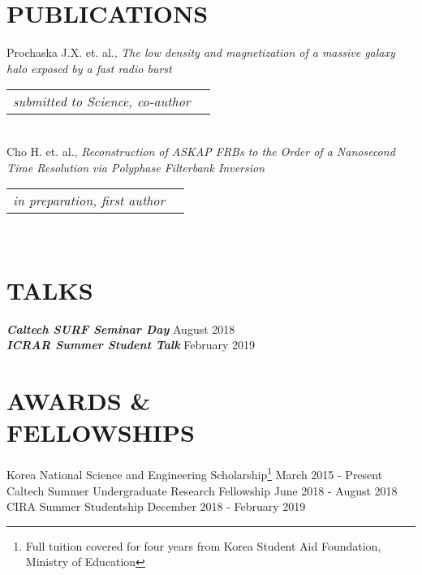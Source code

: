\documentclass[margin, 10pt]{res} %
\begin{document}
\begin{resume}

\section{PUBLICATIONS}
Prochaska J.X. et. al., {\sl The low density and magnetization of a massive galaxy halo exposed by a fast radio burst}\\
\begin{tabular}{rl}
{\sl submitted to Science, co-author}
\end{tabular}\\
Cho H. et. al., {\sl Reconstruction of ASKAP FRBs to the Order of a Nanosecond Time Resolution via Polyphase Filterbank Inversion}\\
\begin{tabular}{rl}
{\sl in preparation, first author}
\end{tabular}\\

\section{TALKS}

{\bf \sl Caltech SURF Seminar Day} \hfill{August 2018}\\
{\bf \sl ICRAR Summer Student Talk} \hfill{February 2019}\\


\section{AWARDS \& \\ FELLOWSHIPS}

Korea National Science and Engineering Scholarship\footnote{Full tuition covered for four years from Korea Student Aid Foundation, Ministry of Education} \hfill March 2015 - Present\\
Caltech Summer Undergraduate Research Fellowship \hfill June 2018 - August 2018\\
CIRA Summer Studentship \hfill December 2018 - February 2019\\



\end{resume}
\end{document}
